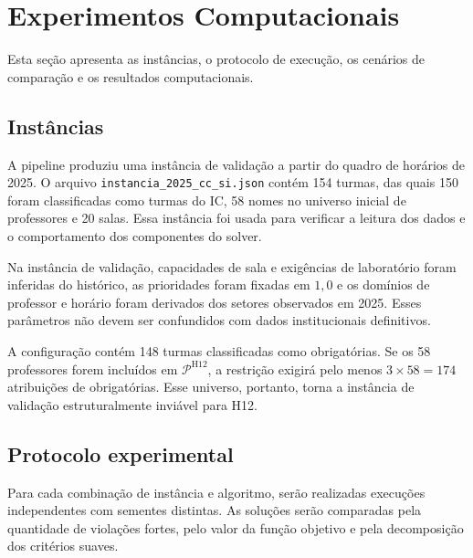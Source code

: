 \section{Experimentos Computacionais}
\label{sec:experimentos}

Esta seção apresenta as instâncias, o protocolo de execução, os cenários de comparação e os resultados computacionais.

\subsection{Instâncias}
\label{subsec:instancias}


A pipeline produziu uma instância de validação a partir do quadro de horários de 2025. O arquivo \texttt{instancia\_2025\_cc\_si.json} contém 154 turmas, das quais 150 foram classificadas como turmas do IC, 58 nomes no universo inicial de professores e 20 salas. Essa instância foi usada para verificar a leitura dos dados e o comportamento dos componentes do solver.

Na instância de validação, capacidades de sala e exigências de laboratório foram inferidas do histórico, as prioridades foram fixadas em $1{,}0$ e os domínios de professor e horário foram derivados dos setores observados em 2025. Esses parâmetros não devem ser confundidos com dados institucionais definitivos.


A configuração contém 148 turmas classificadas como obrigatórias. Se os 58 professores forem incluídos em $\mathcal{P}^{\mathrm{H12}}$, a restrição exigirá pelo menos $3\times58=174$ atribuições de obrigatórias. Esse universo, portanto, torna a instância de validação estruturalmente inviável para H12.

\subsection{Protocolo experimental}
\label{subsec:protocolo}

Para cada combinação de instância e algoritmo, serão realizadas execuções independentes com sementes distintas. As soluções serão comparadas pela quantidade de violações fortes, pelo valor da função objetivo e pela decomposição dos critérios suaves.

